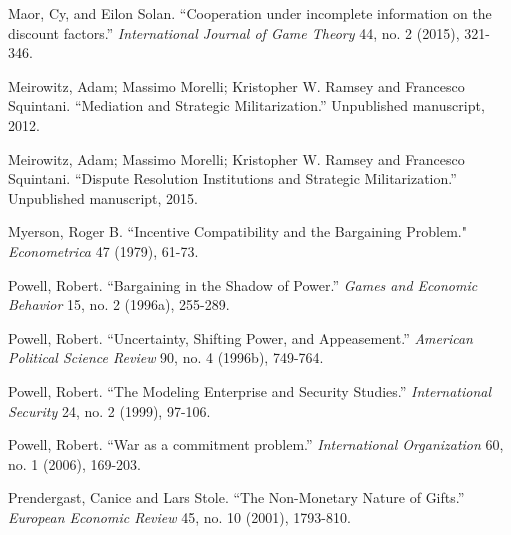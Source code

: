 \documentclass[12pt, letterpaper]{article}
\begin{document}
{\begin{list}{}{\setlength{\leftmargin}{0.0in}\setlength{\rightmargin}{0.0in}\setlength{\itemindent}{0.0in}\setlength{\itemsep}{0.05in}}

\item Maor, Cy, and Eilon Solan. ``Cooperation under incomplete information on the discount factors.'' \emph{International Journal of Game Theory} 44, no. 2 (2015), 321-346.

\item Meirowitz, Adam; Massimo Morelli; Kristopher W. Ramsey and Francesco Squintani. ``Mediation and Strategic Militarization.'' Unpublished manuscript, 2012.

\item Meirowitz, Adam; Massimo Morelli; Kristopher W. Ramsey and Francesco Squintani. ``Dispute Resolution Institutions
and Strategic Militarization.'' Unpublished manuscript, 2015.

\item Myerson, Roger B. ``Incentive Compatibility and the Bargaining Problem." \emph {Econometrica} 47 (1979), 61-73. 


\item Powell, Robert. ``Bargaining in the Shadow of Power.'' \emph{Games and Economic Behavior} 15, no. 2 (1996a), 255-289.

\item Powell, Robert. ``Uncertainty, Shifting Power, and Appeasement.'' \emph{American Political Science Review} 90, no. 4 (1996b), 749-764.

\item Powell, Robert. ``The Modeling Enterprise and Security Studies.'' \emph{International Security} 24, no. 2 (1999), 97-106.

\item Powell, Robert. ``War as a commitment problem.'' \emph{International Organization} 60, no. 1 (2006), 169-203.

\item Prendergast, Canice and Lars Stole. ``The Non-Monetary Nature of Gifts.'' \emph {European Economic Review} 45, no. 10 (2001), 1793-810. 



\end{list}}
\end{document}
